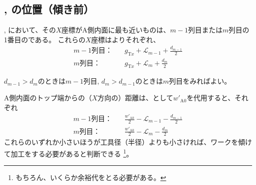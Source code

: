 

\clearpage
\subsection{\BfaceDimple, \DfaceDimple の位置（傾き前）}
\BfaceDimple, \DfaceDimple において、その$X$座標がA側内面に最も近いものは、$m-1$列目または$m$列目の1番目の\nameDimple である。
これらの$X$座標はよりそれぞれ、
\begin{align*}
  m-1\text{列目：}&\quad
  g_{\mathrm Tx}+\mathcal L_{m-1}+\frac{d_{m-1}}2\\
  m\text{列目：}&\quad
  g_{\mathrm Tx}+\mathcal L_m+\frac{d_m}2
\end{align*}
\begin{hosoku}
$d_{m-1} > d_m$のときは$m-1$列目, $d_m > d_{m-1}$のときは$m$列目をみればよい。
\end{hosoku}
A側内面のトップ端からの（$X$方向の）距離は、\TopEndACID として$w'_{\mathrm A0}$を代用すると、それぞれ
\begin{align*}
  m-1\text{列目：}&\quad
  \frac{w'_{\mathrm A0}}2-\mathcal L_{m-1}-\frac{d_{m-1}}2\\
  m\text{列目：}&\quad
  \frac{w'_{\mathrm A0}}2-\mathcal L_m-\frac{d_m}2
\end{align*}
これらのいずれか小さいほうが工具径（半径）よりも小さければ、ワークを傾けて加工をする必要があると判断できる
\footnote{もちろん、いくらか余裕代をとる必要がある。}。
\vfill
